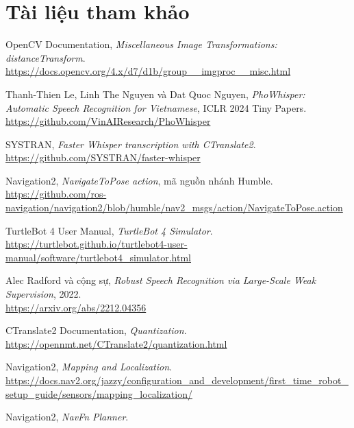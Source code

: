 \documentclass[13pt,a4paper]{extarticle}
\begin{document}
\section*{Tài liệu tham khảo}
\begin{enumerate}[label={[\arabic*]},leftmargin=2em]
    \item \label{ref:opencv} OpenCV Documentation, \textit{Miscellaneous Image Transformations: distanceTransform}.\\
    \url{https://docs.opencv.org/4.x/d7/d1b/group__imgproc__misc.html}
    \item \label{ref:phowhisper} Thanh-Thien Le, Linh The Nguyen và Dat Quoc Nguyen, \textit{PhoWhisper: Automatic Speech Recognition for Vietnamese}, ICLR 2024 Tiny Papers.\\
    \url{https://github.com/VinAIResearch/PhoWhisper}
    \item \label{ref:fasterwhisper} SYSTRAN, \textit{Faster Whisper transcription with CTranslate2}.\\
    \url{https://github.com/SYSTRAN/faster-whisper}
    \item \label{ref:nav2} Navigation2, \textit{NavigateToPose action}, mã nguồn nhánh Humble.\\
    \url{https://github.com/ros-navigation/navigation2/blob/humble/nav2_msgs/action/NavigateToPose.action}
    \item \label{ref:tb4sim} TurtleBot 4 User Manual, \textit{TurtleBot 4 Simulator}.\\
    \url{https://turtlebot.github.io/turtlebot4-user-manual/software/turtlebot4_simulator.html}
    \item \label{ref:whisper} Alec Radford và cộng sự, \textit{Robust Speech Recognition via Large-Scale Weak Supervision}, 2022.\\
    \url{https://arxiv.org/abs/2212.04356}
    \item \label{ref:quantization} CTranslate2 Documentation, \textit{Quantization}.\\
    \url{https://opennmt.net/CTranslate2/quantization.html}
    \item \label{ref:localization} Navigation2, \textit{Mapping and Localization}.\\
    \url{https://docs.nav2.org/jazzy/configuration_and_development/first_time_robot_setup_guide/sensors/mapping_localization/}
    \item \label{ref:navfn} Navigation2, \textit{NavFn Planner}.\\

\end{enumerate}
\end{document}
